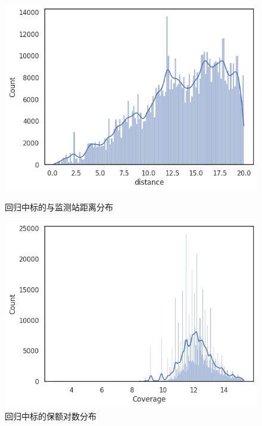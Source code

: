 \begin{figure}[H]
    \begin{minipage}{0.48\linewidth}
        \includegraphics[width=\linewidth]{lib/img/olsdistance.png}
        \caption{回归中标的与监测站距离分布}
    \end{minipage}
    \begin{minipage}{0.48\linewidth}
        \includegraphics[width=\linewidth]{lib/img/coverage.png}
        \caption{回归中标的保额对数分布}
    \end{minipage}
\end{figure}
